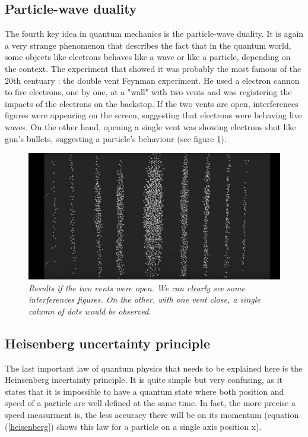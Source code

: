 \documentclass[a4paper,12pt]{report}
\newcommand{\para}[1]{\par{#1}\\}
\begin{document}
        \subsection{Particle-wave duality}

\para{
    The fourth key idea in quantum mechanics is the particle-wave duality. It is again a very strange phenomenon that describes the fact that in the quantum world, some objects like electrons behaves like a wave or like a particle, depending on the context. The experiment that showed it was probably the most famous of the 20th centuary : the double vent Feynman experiment. He used a electron cannon to fire electrons, one by one, at a "wall" with two vents and was registering the impacts of the electrons on the backstop. If the two vents are open, interferences figures were appearing on the screen, suggesting that electrons were behaving live waves. On the other hand, opening a single vent was showing electrons shot like gun's bullets, suggesting a particle's behaviour (see figure \ref{feynman}).
}

\begin{figure}
	\begin{center}
		\includegraphics[scale=0.3]{images/feynman}
	\end{center}
	\caption{\textit{Results if the two vents were open. We can clearly see some interferences figures. On the other, with one vent close, a single column of dots would be observed.}}
	\label{feynman}
\end{figure}

        \subsection{Heisenberg uncertainty principle}

\para{
    The last important law of quantum physics that needs to be explained here is the Heinsenberg incertainty principle. It is quite simple but very confusing, as it states that it is impossible to have a quantum state where both position and speed of a particle are well defined at the same time. In fact, the more precise a speed measurment is, the less accuracy there will be on its momentum (equation (\ref{heisenberg}) shows this law for a particle on a single axis position x).
}
\end{document}
